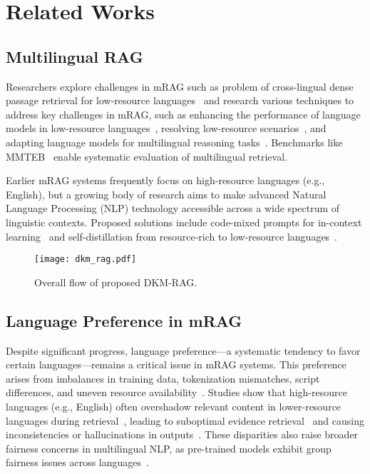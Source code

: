 \section{Related Works}
\subsection{Multilingual RAG}
Researchers explore challenges in mRAG such as problem of cross-lingual dense passage retrieval for low-resource languages~\cite{wu2024limitscrosslingualdensepassage} and research various techniques to address key challenges in mRAG, such as enhancing the performance of language models in low-resource languages~\cite{deshpande2024chain}, resolving low-resource scenarios~\cite{zhang-etal-2024-enhancing-multilingual}, and adapting language models for multilingual reasoning tasks~\cite{yoon-etal-2024-langbridge}. Benchmarks like \textsc{MMTEB}~\cite{enevoldsen2025mmteb} enable systematic evaluation of multilingual retrieval.

Earlier mRAG systems frequently focus on high-resource languages (e.g., English), but a growing body of research aims to make advanced Natural Language Processing (NLP) technology accessible across a wide spectrum of linguistic contexts. Proposed solutions include code-mixed prompts for in-context learning~\cite{shankar-etal-2024-context} and self-distillation from resource-rich to low-resource languages~\cite{zhang-etal-2024-enhancing-multilingual}.


\begin{figure}[h]
    \centering
    \texttt{[image: dkm\_rag.pdf]}
    \caption{Overall flow of proposed DKM-RAG.}
    \label{fig:dkm_rag}
\end{figure}

\subsection{Language Preference in mRAG}
Despite significant progress, language preference—a systematic tendency to favor certain languages—remains a critical issue in mRAG systems. This preference arises from imbalances in training data, tokenization mismatches, script differences, and uneven resource availability~\cite{sharma2024fauxpolyglotstudyinformation, wu2024languagesequalinsightsmultilingual}. Studies show that high-resource languages (e.g., English) often overshadow relevant content in lower-resource languages during retrieval~\cite{yang-etal-2024-language-bias, chirkova-etal-2024-retrieval}, leading to suboptimal evidence retrieval~\cite{10.1145/3626772.3657943} and causing inconsistencies or hallucinations in outputs~\cite{chataigner2024multilingualhallucinationgapslarge}. These disparities also raise broader fairness concerns in multilingual NLP, as pre-trained models exhibit group fairness issues across languages~\cite{cabello-piqueras-sogaard-2022-pretrained, ramesh-etal-2023-fairness}.


